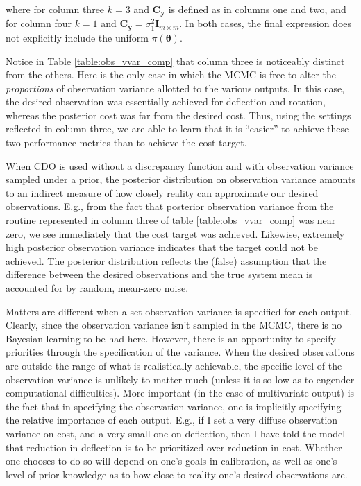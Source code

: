 \documentclass{article}
\begin{document}
where for column three $k=3$ and $\mathbf C_{\mathbf y}$ is defined as in columns one and two, and for column four $k=1$ and $\mathbf C_{\mathbf y}=\sigma^2_1 \mathbf I_{m\times m}$. In both cases, the final expression does not explicitly include the uniform $\pi(\boldsymbol\theta)$.

Notice in Table \ref{table:obs_vvar_comp} that column three is noticeably distinct from the others. Here is the only case in which the MCMC is free to alter the \emph{proportions} of observation variance allotted to the various outputs. In this case, the desired observation was essentially achieved for deflection and rotation, whereas the posterior cost was far from the desired cost. Thus, using the settings reflected in column three, we are able to learn that it is ``easier'' to achieve these two performance metrics than to achieve the cost target.

When CDO is used without a discrepancy function and with observation variance sampled under a prior, the posterior distribution on observation variance amounts to an indirect measure of how closely reality can approximate our desired observations. E.g., from the fact that posterior observation variance from the routine represented in column three of table \ref{table:obs_vvar_comp} was near zero, we see immediately that the cost target was achieved. Likewise, extremely high posterior observation variance indicates that the target could not be achieved. The posterior distribution reflects the (false) assumption that the difference between the desired observations and the true system mean is accounted for by random, mean-zero noise. 

Matters are different when a set observation variance is specified for each output. Clearly, since the observation variance isn't sampled in the MCMC, there is no Bayesian learning to be had here. However, there is an opportunity to specify priorities through the specification of the variance. When the desired observations are outside the range of what is realistically achievable, the specific level of the observation variance is unlikely to matter much (unless it is so low as to engender computational difficulties). More important (in the case of multivariate output) is the fact that in specifying the observation variance, one is implicitly specifying the relative importance of each output. E.g., if I set a very diffuse observation variance on cost, and a very small one on deflection, then I have told the model that reduction in deflection is to be prioritized over reduction in cost. Whether one chooses to do so will depend on one's goals in calibration, as well as one's level of prior knowledge as to how close to reality one's desired observations are.
\end{document}
